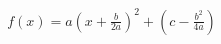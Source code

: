 \documentclass[preview]{standalone}
\begin{document}
\begin{align*}
f(x) = a\left(x + \frac{b}{2a}\right)^2 + (c - \frac{b^2}{4a})
\end{align*}
\end{document}
